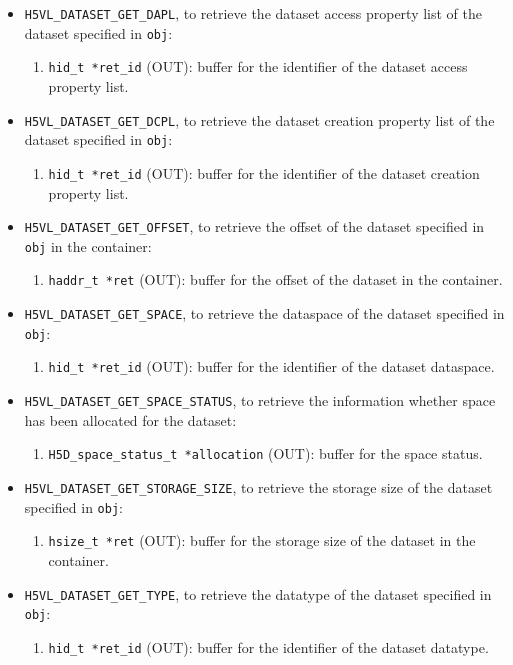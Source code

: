 \begin{itemize}
\item {\tt H5VL\_DATASET\_GET\_DAPL}, to retrieve the dataset access
  property list of the dataset specified in {\tt obj}:
  \begin{enumerate}
  \item {\tt hid\_t *ret\_id} (OUT): buffer for the identifier of the
    dataset access property list.
  \end{enumerate}

\item {\tt H5VL\_DATASET\_GET\_DCPL}, to retrieve the dataset creation
  property list of the dataset specified in {\tt obj}:
  \begin{enumerate}
  \item {\tt hid\_t *ret\_id} (OUT): buffer for the identifier of the
    dataset creation property list.
  \end{enumerate}

\item {\tt H5VL\_DATASET\_GET\_OFFSET}, to retrieve the offset of the
  dataset specified in {\tt obj} in the container:
  \begin{enumerate}
  \item {\tt haddr\_t *ret} (OUT): buffer for the offset of the
    dataset in the container.
  \end{enumerate}

\item {\tt H5VL\_DATASET\_GET\_SPACE}, to retrieve the dataspace of the
  dataset specified in {\tt obj}:
  \begin{enumerate}
  \item {\tt hid\_t *ret\_id} (OUT): buffer for the identifier of the
    dataset dataspace.
  \end{enumerate}

\item {\tt H5VL\_DATASET\_GET\_SPACE\_STATUS}, to retrieve the
  information whether space has been allocated for the dataset:
  \begin{enumerate}
  \item {\tt H5D\_space\_status\_t *allocation} (OUT): buffer for the
    space status.
  \end{enumerate}

\item {\tt H5VL\_DATASET\_GET\_STORAGE\_SIZE}, to retrieve the storage
  size of the dataset specified in {\tt obj}:
  \begin{enumerate}
  \item {\tt hsize\_t *ret} (OUT): buffer for the storage size of
    the dataset in the container.
  \end{enumerate}

\item {\tt H5VL\_DATASET\_GET\_TYPE}, to retrieve the datatype of the
  dataset specified in {\tt obj}:
  \begin{enumerate}
  \item {\tt hid\_t *ret\_id} (OUT): buffer for the identifier of the
    dataset datatype.
  \end{enumerate}
\end{itemize}

